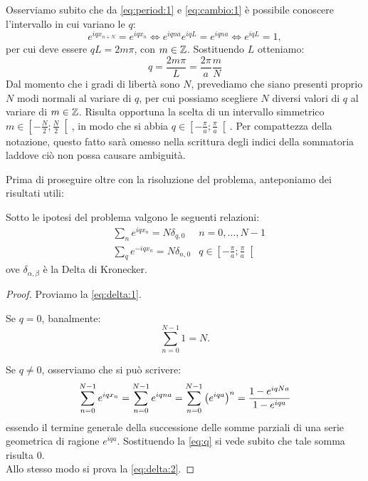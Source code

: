     \par Osserviamo subito che da \eqref{eq:period:1} e \eqref{eq:cambio:1} \`e possibile conoscere l'intervallo in cui variano le $q$: $$e^{iqx_{n+N}}=e^{iqx_n} \iff e^{iqna}e^{iqL}=e^{iqna} \iff e^{iqL}=1,$$ per cui deve essere $qL=2m\pi$, con $m\in\mathbb{Z}$. Sostituendo $L$ otteniamo:
    \begin{equation}
        q=\frac{2m\pi}{L}=\frac{2\pi}{a}\frac{m}{N}
        \label{eq:q}
    \end{equation}
    Dal momento che i gradi di libert\`a sono $N$, prevediamo che siano presenti proprio $N$ modi normali al variare di $q$, per cui possiamo scegliere $N$ diversi valori di $q$ al variare di $m\in\mathbb{Z}$. Risulta opportuna la scelta di un intervallo simmetrico $\displaystyle m\in\left[-\frac{N}{2};\frac{N}{2}\right[$, in modo che si abbia $\displaystyle q\in\left[-\frac{\pi}{a};\frac{\pi}{a}\right[$. Per compattezza della notazione, questo fatto sar\`a omesso nella scrittura degli indici della sommatoria laddove ci\`o non possa causare ambiguit\`a. 
    \par Prima di proseguire oltre con la risoluzione del problema, anteponiamo dei risultati utili:
    \begin{lemma} \label{lm:delta}
        Sotto le ipotesi del problema valgono le seguenti relazioni:
        \begin{align}
            &\sum_{n}e^{iqx_n}=N\delta_{q,0} &n=0,\dots,N-1 \label{eq:delta:1}\\
            &\sum_{q}e^{-iqx_n}=N\delta_{n,0} &q\in\left[-\frac{\pi}{a};\frac{\pi}{a}\right[ \label{eq:delta:2}
        \end{align}
    ove $\delta_{\alpha,\beta}$ \`e la Delta di Kronecker.
    \end{lemma}
    \begin{proof}
        Proviamo la \eqref{eq:delta:1}. \par Se $q=0$, banalmente: $$\sum_{n=0}^{N-1}1=N.$$ \par Se $q\neq0$, osserviamo che si pu\`o scrivere: $$\sum_{n=0}^{N-1} e^{iqx_n}=\sum_{n=0}^{N-1} e^{iqna}=\sum_{n=0}^{N-1}\qty(e^{iqa})^n=\frac{1-e^{iqNa}}{1-e^{iqa}}$$ essendo il termine generale della successione delle somme parziali di una serie geometrica di ragione $e^{iqa}$. Sostituendo la \eqref{eq:q} si vede subito che tale somma risulta $0$. \\ Allo stesso modo si prova la \eqref{eq:delta:2}.
    \end{proof}
